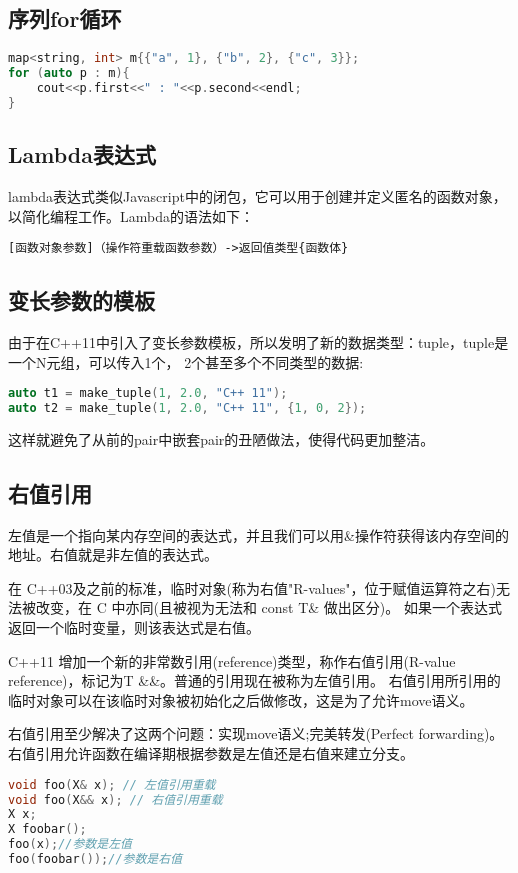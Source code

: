 \subsection{序列for循环}
\begin{lstlisting}[language=C++]
map<string, int> m{{"a", 1}, {"b", 2}, {"c", 3}};  
for (auto p : m){  
    cout<<p.first<<" : "<<p.second<<endl;  
} 
\end{lstlisting}

\subsection{Lambda表达式}
lambda表达式类似Javascript中的闭包，它可以用于创建并定义匿名的函数对象，以简化编程工作。Lambda的语法如下：
\begin{verbatim}
[函数对象参数]（操作符重载函数参数）->返回值类型{函数体}
\end{verbatim}


\subsection{变长参数的模板}
由于在C++11中引入了变长参数模板，所以发明了新的数据类型：tuple，tuple是一个N元组，可以传入1个， 2个甚至多个不同类型的数据:
\begin{lstlisting}[language=C++]
auto t1 = make_tuple(1, 2.0, "C++ 11");  
auto t2 = make_tuple(1, 2.0, "C++ 11", {1, 0, 2}); 
\end{lstlisting}
这样就避免了从前的pair中嵌套pair的丑陋做法，使得代码更加整洁。

\subsection{右值引用}
左值是一个指向某内存空间的表达式，并且我们可以用\&操作符获得该内存空间的地址。右值就是非左值的表达式。

在 C++03及之前的标准，临时对象(称为右值"R-values"，位于赋值运算符之右)无法被改变，在 C 中亦同(且被视为无法和 const T\& 做出区分)。
如果一个表达式返回一个临时变量，则该表达式是右值。

C++11 增加一个新的非常数引用(reference)类型，称作右值引用(R-value reference)，标记为T \&\&。普通的引用现在被称为左值引用。
右值引用所引用的临时对象可以在该临时对象被初始化之后做修改，这是为了允许move语义。

右值引用至少解决了这两个问题：实现move语义;完美转发(Perfect forwarding)。
右值引用允许函数在编译期根据参数是左值还是右值来建立分支。

\begin{lstlisting}[language=C++]
void foo(X& x); // 左值引用重载
void foo(X&& x); // 右值引用重载
X x;
X foobar();
foo(x);//参数是左值
foo(foobar());//参数是右值
\end{lstlisting}

